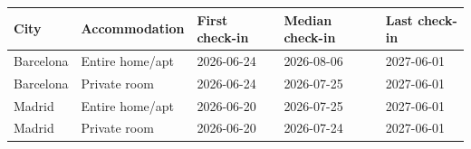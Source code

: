 \begin{tabular}{lllll}
\toprule
City & Accommodation & First check-in & Median check-in & Last check-in \\
\midrule
Barcelona & Entire home/apt & 2026-06-24 & 2026-08-06 & 2027-06-01 \\
Barcelona & Private room & 2026-06-24 & 2026-07-25 & 2027-06-01 \\
Madrid & Entire home/apt & 2026-06-20 & 2026-07-25 & 2027-06-01 \\
Madrid & Private room & 2026-06-20 & 2026-07-24 & 2027-06-01 \\
\bottomrule
\end{tabular}

